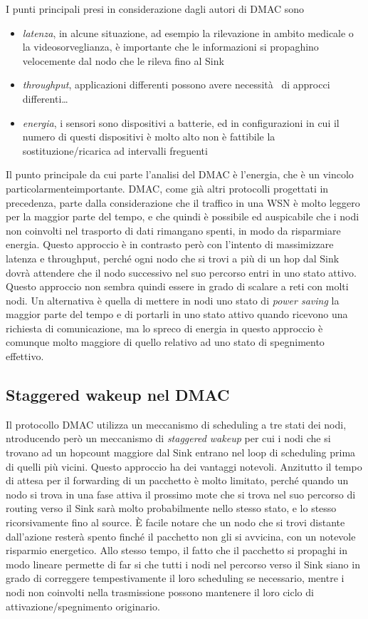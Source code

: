 \documentclass[pdftex,12pt,a4paper,italian]{article}
\begin{document}
I punti principali presi in considerazione dagli autori di DMAC sono
\begin{itemize}

\item \emph{latenza}, in alcune situazione, ad esempio la rilevazione in ambito medicale o 
la videosorveglianza, è importante che le informazioni si propaghino velocemente dal nodo che le 
rileva fino al Sink
\item \emph{throughput}, applicazioni differenti possono avere necessità  di approcci differenti\ldots

\item \emph{energia}, i sensori sono dispositivi a batterie, ed in configurazioni in cui il 
numero di questi dispositivi è molto alto non è fattibile la sostituzione/ricarica ad 
intervalli freguenti

\end{itemize}

Il punto principale da cui parte l'analisi del DMAC è l'energia, che è un vincolo particolarmenteimportante. DMAC, come già altri protocolli progettati in precedenza, parte dalla 
considerazione che il traffico in una WSN è molto leggero per la maggior parte del tempo, e 
che quindi è 
possibile ed auspicabile che i nodi non coinvolti nel trasporto di dati rimangano spenti, 
in modo da risparmiare energia. 
Questo approccio è in contrasto però con l'intento di massimizzare latenza e throughput, 
perché ogni nodo che si trovi a più di un hop dal Sink dovrà attendere che il nodo successivo 
nel suo percorso entri in uno stato attivo. Questo approccio non sembra quindi essere in grado 
di scalare a reti con molti nodi. 
Un alternativa è quella di mettere in nodi uno stato di \emph{power saving} la 
maggior parte del tempo e di portarli in uno stato attivo quando ricevono una richiesta di 
comunicazione, ma lo spreco di energia in questo approccio è comunque molto maggiore di quello 
relativo ad uno stato di spegnimento effettivo. 
\subsection{Staggered wakeup nel DMAC}
Il protocollo DMAC utilizza un meccanismo di scheduling a tre stati dei nodi, 
ntroducendo però un meccanismo di \emph{staggered wakeup} per cui i nodi che si trovano ad un 
hopcount maggiore dal Sink entrano nel loop di scheduling prima di quelli più vicini.
Questo approccio ha dei vantaggi notevoli. Anzitutto il tempo di attesa per il forwarding di un pacchetto è molto limitato, perché quando un nodo si trova in una fase attiva il prossimo mote 
che si trova nel suo percorso di routing verso il Sink sarà molto probabilmente nello stesso 
stato, e lo stesso ricorsivamente fino al source. 
\`E facile notare che un nodo che si trovi distante dall'azione resterà spento finché il 
pacchetto non gli si avvicina, con un notevole risparmio energetico.
Allo stesso tempo, il fatto che il pacchetto si propaghi in modo lineare permette di far si che 
tutti i nodi nel percorso verso il Sink siano in grado di correggere tempestivamente il loro 
scheduling se necessario, mentre i nodi non coinvolti nella trasmissione possono mantenere il 
loro ciclo di attivazione/spegnimento originario. 
\end{document}
